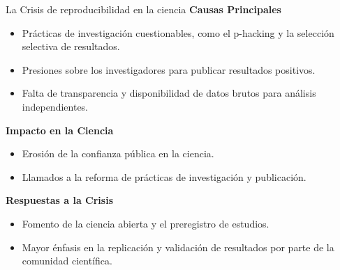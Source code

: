 ﻿\documentclass{beamer}
\begin{document}
\begin{frame}{La Crisis de reproducibilidad en la ciencia}
\textbf{Causas Principales}
\begin{itemize}
    \item Prácticas de investigación cuestionables, como el p-hacking y la selección selectiva de resultados.
    \item Presiones sobre los investigadores para publicar resultados positivos.
    \item Falta de transparencia y disponibilidad de datos brutos para análisis independientes.
\end{itemize}

\textbf{Impacto en la Ciencia}
\begin{itemize}
    \item Erosión de la confianza pública en la ciencia.
    \item Llamados a la reforma de prácticas de investigación y publicación.
\end{itemize}

\textbf{Respuestas a la Crisis}
\begin{itemize}
    \item Fomento de la ciencia abierta y el preregistro de estudios.
    \item Mayor énfasis en la replicación y validación de resultados por parte de la comunidad científica.
\end{itemize}
\end{frame}
\end{document}
